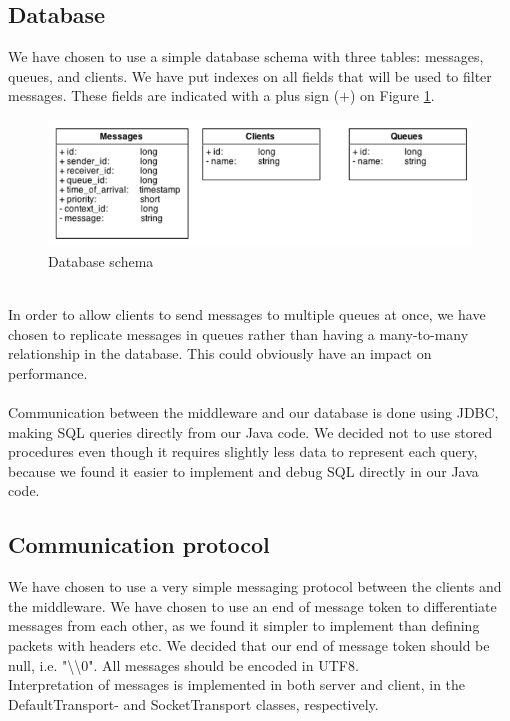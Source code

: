 \documentclass{article}
\begin{document}
        \subsection{Database}
            We have chosen to use a simple database schema with three tables: messages, queues, and clients. We have put indexes on all fields that will be used to filter messages. These fields are indicated with a plus sign ($+$) on Figure \ref{fig:database_schema}. 
            \begin{figure}[H]
                \centering
                \includegraphics[scale=0.50]{database_schema}
                \caption{Database schema}
                \label{fig:database_schema}
            \end{figure}
             \\
            In order to allow clients to send messages to multiple queues at once, we have chosen to replicate messages in queues rather than having a many-to-many relationship in the database. This could obviously have an impact on performance.\\
            \\
            Communication between the middleware and our database is done using JDBC, making SQL queries directly from our Java code. We decided not to use stored procedures even though it requires slightly less data to represent each query, because we found it easier to implement and debug SQL directly in our Java code. 

        \subsection{Communication protocol}
            We have chosen to use a very simple messaging protocol between the clients and the middleware. We have chosen to use an end of message token to differentiate messages from each other, as we found it simpler to implement than defining packets with headers etc. We decided that our end of message token should be null, i.e. "\textbackslash\textbackslash0". All messages should be encoded in UTF8.\\
            Interpretation of messages is implemented in both server and client, in the DefaultTransport- and SocketTransport classes, respectively.
\end{document}
